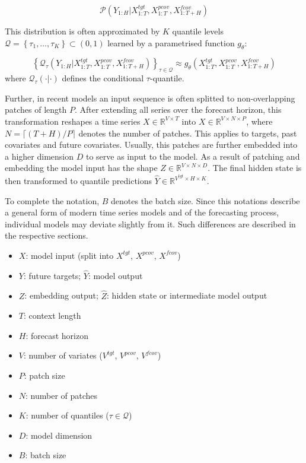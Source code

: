 \begin{equation}
	\mathcal{P} \left(Y_{1:H} | X^{tgt}_{1:T}, X^{pcov}_{1:T}, X^{fcov}_{1:T+H} \right)
\end{equation}

This distribution is often approximated by $K$ quantile levels $\mathcal{Q} = \left\{\tau_1, \hdots, \tau_K \right\} \subset (0,1)$ learned by a parametrised function $g_{\theta}$:

\begin{equation}
	\left\{\mathcal{Q}_\tau \left(Y_{1:H} | X^{tgt}_{1:T}, X^{pcov}_{1:T}, X^{fcov}_{1:T+H} \right)\right\}_{\tau \in \mathcal{Q}} \approx g_{\theta} \left( X^{tgt}_{1:T}, X^{pcov}_{1:T}, X^{fcov}_{1:T+H}\right)
\end{equation}
where $\mathcal{Q}_\tau (\cdot | \cdot)$ defines the conditional $\tau$-quantile.

Further, in recent models an input sequence is often splitted to non-overlapping patches of length $P$. After extending all series over the forecast horizon, this transformation reshapes a time series $X \in \mathbb{R}^{V \times T}$ into $X \in \mathbb{R}^{V \times N \times P}$, where $N = \lceil (T + H) / P \rceil$ denotes the number of patches. This applies to targets, past covariates and future covariates. 
Usually, this patches are further embedded into a higher dimension $D$ to serve as input to the model. As a result of patching and embedding the model input has the shape $Z \in \mathbb{R}^{V \times N \times D}$. The final hidden state is then transformed to quantile predictions $\hat{Y} \in \mathbb{R}^{V^{tgt} \times H \times K}$.

To complete the notation, $B$ denotes the batch size. Since this notations describe a general form of modern time series models and of the forecasting process, individual models may deviate slightly from it. Such differences are described in the respective sections.

\begin{itemize}
	\item $X$: model input (split into $X^{tgt}$, $X^{pcov}$, $X^{fcov}$)
	\item $Y$: future targets; $\hat{Y}$: model output
	\item $Z$: embedding output; $\hat{Z}$: hidden state or intermediate model output 
	\item $T$: context length
	\item $H$: forecast horizon
	\item $V$: number of variates ($V^{tgt}$, $V^{pcov}$, $V^{fcov}$)
	\item $P$: patch size
	\item $N$: number of patches
	\item $K$: number of quantiles ($\tau \in \mathcal{Q}$)
	\item $D$: model dimension
	\item $B$: batch size
\end{itemize}


